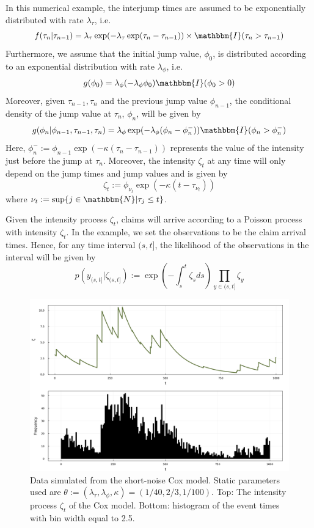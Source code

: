 \documentclass[12pt,a4paper]{article}
\begin{document}
In this numerical example, the interjump times are assumed to be exponentially distributed with rate \(\lambda_\tau\), i.e. 
\[
  f(\tau_n|\tau_{n-1}) = \lambda_\tau \exp(-\lambda_\tau\exp(\tau_n-\tau_{n-1}))\times \mathbbm{I}(\tau_n > \tau_{n-1})  
\]
Furthermore, we assume that the initial jump value, \(\phi_0\), is distributed according to an exponential distribution with rate \(\lambda_\phi\), i.e. 
\[
    g(\phi_0)= \lambda_\phi(-\lambda_\phi\phi_0)\mathbbm{I}(\phi_0>0)
\]
Moreover, given \(\tau_{n-1},\tau_n\) and the previous jump value \(\phi_{n-1}\), the conditional density of the jump value at \(\tau_n\), \(\phi_n\), will be given by
\[
    g(\phi_n|\phi_{n-1},\tau_{n-1},\tau_n) = \lambda_\phi \exp(-\lambda_\phi(\phi_n - \phi_{n}^{-}))\mathbbm{I}(\phi_n > \phi_n^{-})
\]
Here, \(\phi_n^{-}:=\phi_{n-1}\exp(-\kappa(\tau_n-\tau_{n-1}))\) represents the value of the intensity just before the jump at \(\tau_n\). Moreover, the intensity \(\zeta_t\) at any time will only depend on the jump times and jump values and is given by 
\[
    \zeta_t := \phi_{\nu_t}\exp(-\kappa(t-\tau_{\nu_t}))
\]
where \(\nu_t:= \sup \{ j \in \mathbbm{N} | \tau_j \leq t\}\). 

Given the intensity process \(\zeta_t\), claims will arrive according to a Poisson process with intensity \(\zeta_t\). In the example, we set the observations to be the claim arrival times. Hence, for any time interval \((s,t]\), the likelihood of the observations in the interval will be given by 
\[
  p(y_{(s,t]}|\zeta_{(s,t]}) := \exp \left(-\int_{s}^{t} \zeta_s ds\right) \prod_{y \in (s,t]} \zeta_y 
\]
\begin{figure}[htb!]
    \centering
    \includegraphics[width=\textwidth]{SNC_Data.pdf}
    \caption{Data simulated from the short-noise Cox model. Static parameters used are \(\theta:=(\lambda_\tau,\lambda_\phi,\kappa)= (1/40,2/3,1/100)\). Top: The intensity process \(\zeta_t\) of the Cox model. Bottom: histogram of the event times with bin width equal to 2.5.}
    \label{Figure: SNC Data}
\end{figure}
\end{document}
